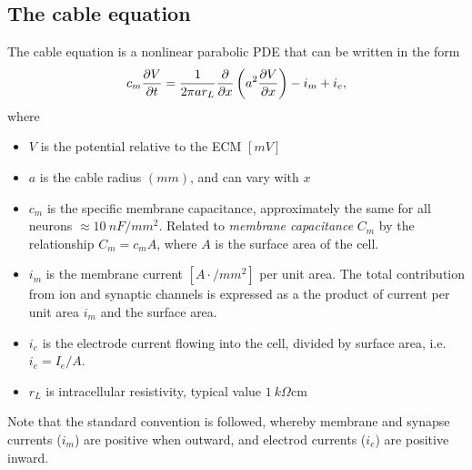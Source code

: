 \subsection{The cable equation}
The cable equation is a nonlinear parabolic PDE that can be written in the form
\begin{equation}
    \label{eq:cable}
    c_m \frac{\partial{V}}{\partial{t}} = \frac{1}{2\pi a r_{L}} \frac{\partial{}}{\partial{x}} \left( a^2 \frac{\partial{V}}{\partial{x}} \right) - i_m + i_e,
\end{equation}
where
\begin{itemize}
    \item $V$ is the potential relative to the ECM $[mV]$
    \item $a$ is the cable radius $(mm)$, and can vary with $x$
    \item $c_m$ is the {specific membrane capacitance}, approximately the same for all neurons $\approx 10~nF/mm^2$. Related to \emph{membrane capacitance} $C_m$ by the relationship $C_m=c_{m}A$, where $A$ is the surface area of the cell.
    \item $i_m$ is the membrane current $[A\cdot/mm^{2}]$ per unit area. The total contribution from ion and synaptic channels is expressed as a the product of current per unit area $i_m$ and the surface area.
    \item $i_e$ is the electrode current flowing into the cell, divided by surface area, i.e. $i_e=I_e/A$.
    \item $r_L$ is intracellular resistivity, typical value $1~k\Omega \text{cm}$
\end{itemize}

Note that the standard convention is followed, whereby membrane and synapse currents ($i_m$) are positive when outward, and electrod currents ($i_e$) are positive inward.

